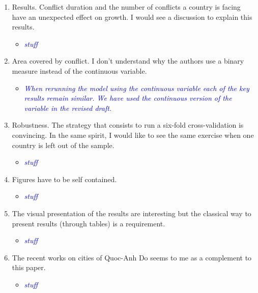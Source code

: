 \begin{enumerate}
\item Results. Conflict duration and the number of conflicts a country is facing have an unexpected effect on growth. I would see a discussion to explain this results.

\begin{itemize}
\item \textcolor{blue}{\emph{stuff}}
\end{itemize}

\item Area covered by conflict. I don’t understand why the authors use a binary measure instead of the continuous variable.

\begin{itemize}
\item \textcolor{blue}{\emph{
	When rerunning the model using the continuous variable each of the key results remain similar. We have used the continuous version of the variable in the revised draft.
}}
\end{itemize}

\item Robustness. The strategy that consists to run a six-fold cross-validation is convincing. In the same spirit, I would like to see the same exercise when one country is left out of the sample.

\begin{itemize}
\item \textcolor{blue}{\emph{stuff}}
\end{itemize}

\item Figures have to be self contained.

\begin{itemize}
\item \textcolor{blue}{\emph{stuff}}
\end{itemize}

\item The visual presentation of the results are interesting but the classical way to present results (through tables) is a requirement.

\begin{itemize}
\item \textcolor{blue}{\emph{stuff}}
\end{itemize}

\item The recent works on cities of Quoc-Anh Do seems to me as a complement to this paper.

\begin{itemize}
\item \textcolor{blue}{\emph{stuff}}
\end{itemize}

\end{enumerate}